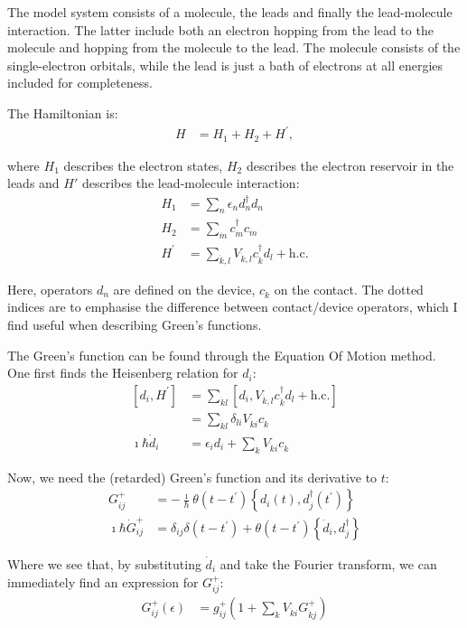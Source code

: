 The model system consists of a molecule, the leads and finally the lead-molecule interaction. The latter include both an electron hopping from the lead to the molecule and hopping from the molecule to the lead. The molecule consists of the single-electron orbitals, while the lead is just a bath of electrons at all energies included for completeness.

The Hamiltonian is:
\begin{align}
H &= H_1 + H_2 + H^\prime, \label{eq:hamiltonian}
\end{align}

where $H_1$ describes the electron states, $H_2$ describes the electron reservoir in the leads and $H'$ describes the lead-molecule interaction:
\begin{align*}
H_1 &= \sum_n \epsilon_n d^\dagger_n d_n \\
H_2 &= \sum_{\dot{m}} c^\dagger_{\dot{m}} c_{\dot{m}} \\
H^\prime &= \sum_{\dot{k}, l} V_{\dot{k}, l} c^\dagger_{\dot{k}} d_l + \text{h.c.}
\end{align*}

Here, operators $d_n$ are defined on the device, $c_{\dot{k}}$ on the contact. The dotted indices are to emphasise the difference between contact/device operators, which I find useful when describing Green's functions. 

The Green's function can be found through the Equation Of Motion method. One first finds the Heisenberg relation for $d_i$:
\begin{align*}
\left[ d_i, H^\prime\right] &= \sum_{\dot{k}l}\left[d_i, V_{\dot{k}, l} c^\dagger_{\dot{k}} d_l + \text{h.c.}\right] \\
&= \sum_{\dot{k}l}\delta_{li} V_{\dot{k}i} c_{\dot{k}}\\
\imath\hbar \dot{d}_i &= \epsilon_i d_i + \sum_{\dot{k}}V_{\dot{k}i} c_{\dot{k}}
\end{align*}

Now, we need the (retarded) Green's function and its derivative to $t$:
\begin{align*}
G_{ij}^+ &= - \frac{\imath}{\hbar} \theta(t-t^\prime) \left\{ d_i(t), d_j^\dagger(t^\prime) \right\} \\
\imath\hbar \dot{G}_{ij}^+ &= \delta_{ij} \delta(t - t^\prime) + \theta(t-t^\prime) \left\{ \dot{d}_i, d_j^\dagger\right\}
\end{align*}

Where we see that, by substituting $\dot{d}_i$ and take the Fourier transform, we can immediately find an expression for $G_{ij}^+$:
\begin{align*} 
G_{ij}^+ (\epsilon) &= g_{ij}^+ \left( 1 + \sum_{\dot{k}} V_{\dot{k}i} G_{\dot{k}j}^+ \right)
\end{align*}

